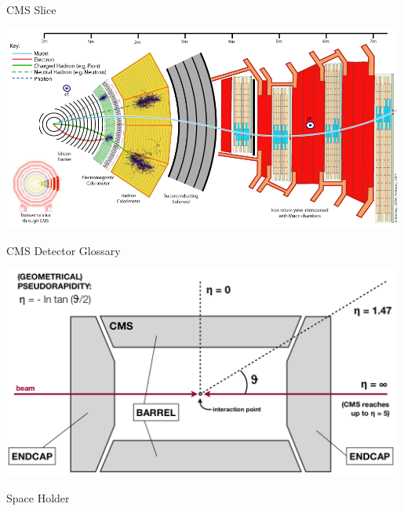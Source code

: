 \begin{frame}{CMS Slice}
\begin{center}
\includegraphics[width=0.99\textwidth]{images/CMS_Slice.png}
\end{center}
\end{frame}

\begin{frame}{CMS Detector Glossary}
\begin{center}
\includegraphics[width=0.99\textwidth]{images/DetectorGlossary.png}
\end{center}
\end{frame}

\begin{frame}{Space Holder}
\begin{center}
\end{center}
\end{frame}

